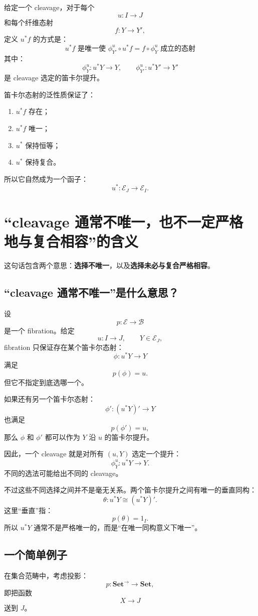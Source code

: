 \documentclass[12pt,a4paper]{article}
\begin{document}
给定一个 cleavage，对于每个
\[
u:I\to J
\]
和每个纤维态射
\[
f:Y\to Y',
\]
定义 \(u^*f\) 的方式是：
\[
\boxed{
u^*f
\text{ 是唯一使 }
\phi_{Y'}^u\circ u^*f
=
f\circ\phi_Y^u
\text{ 成立的态射}
}
\]
其中：
\[
\phi_Y^u:u^*Y\to Y,
\qquad
\phi_{Y'}^u:u^*Y'\to Y'
\]
是 cleavage 选定的笛卡尔提升。

笛卡尔态射的泛性质保证了：
\begin{enumerate}
  \item \(u^*f\) 存在；
  \item \(u^*f\) 唯一；
  \item \(u^*\) 保持恒等；
  \item \(u^*\) 保持复合。
\end{enumerate}
所以它自然成为一个函子：
\[
u^*:\mathcal{E}_J\to\mathcal{E}_I.
\]

\newpage

\section{“cleavage 通常不唯一，也不一定严格地与复合相容”的含义}

这句话包含两个意思：\textbf{选择不唯一}，以及\textbf{选择未必与复合严格相容}。

\subsection{“cleavage 通常不唯一”是什么意思？}

设
\[
p:\mathcal{E}\to\mathcal{B}
\]
是一个 fibration。给定
\[
u:I\to J,
\qquad
Y\in\mathcal{E}_J,
\]
fibration 只保证存在某个笛卡尔态射：
\[
\phi:u^*Y\to Y
\]
满足
\[
p(\phi)=u.
\]
但它不指定到底选哪一个。

如果还有另一个笛卡尔态射：
\[
\phi':(u^*Y)'\to Y
\]
也满足
\[
p(\phi')=u,
\]
那么 \(\phi\) 和 \(\phi'\) 都可以作为 \(Y\) 沿 \(u\) 的笛卡尔提升。

因此，一个 cleavage 就是对所有 \((u,Y)\) 选定一个提升：
\[
\phi_Y^u:u^*Y\to Y.
\]
不同的选法可能给出不同的 cleavage。

不过这些不同选择之间并不是毫无关系。两个笛卡尔提升之间有唯一的垂直同构：
\[
\theta:u^*Y\cong (u^*Y)'.
\]
这里“垂直”指：
\[
p(\theta)=1_I.
\]
所以 \(u^*Y\) 通常不是严格唯一的，而是“在唯一同构意义下唯一”。

\subsection{一个简单例子}

在集合范畴中，考虑投影：
\[
p:\mathbf{Set}^{\to}\to\mathbf{Set},
\]
即把函数
\[
X\to J
\]
送到 \(J\)。
\end{document}
